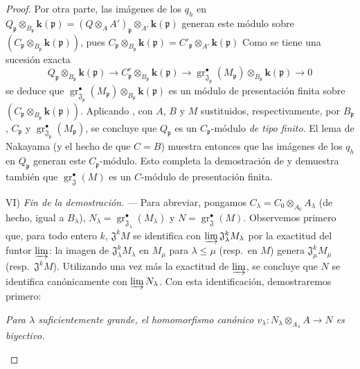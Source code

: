 \begin{proof}
Por otra parte, las imágenes de los $q_h$ en
$Q_\mathfrak p\otimes_{B_\mathfrak p}\boldsymbol{k}(\mathfrak p)
=(Q\otimes_AA')_\mathfrak p\otimes_{A'}\boldsymbol{k}(\mathfrak p)$
generan este módulo sobre $(C_\mathfrak p\otimes_{B_\mathfrak p}\boldsymbol{k}(\mathfrak p))$, pues
$C_\mathfrak p\otimes_{B_\mathfrak p}\boldsymbol{k}(\mathfrak p)
=C'_\mathfrak p\otimes_{A'}\boldsymbol{k}(\mathfrak p)$
Como se tiene una sucesión exacta
\[
Q_\mathfrak p\otimes_{B_\mathfrak p}\boldsymbol{k}(\mathfrak p)
\longrightarrow C_\mathfrak p^{r}\otimes_{B_\mathfrak p}\boldsymbol{k}(\mathfrak p)
\longrightarrow
\operatorname{gr}_{\mathfrak J_\mathfrak p}^\bullet(M_\mathfrak p)
\otimes_{B_\mathfrak p}\boldsymbol{k}(\mathfrak p)\longrightarrow0
\]
se deduce que $\operatorname{gr}_{\mathfrak J_\mathfrak p}^\bullet(M_\mathfrak p)
\otimes_{B_\mathfrak p}\boldsymbol{k}(\mathfrak p)$ es un módulo de presentación finita sobre $(C_\mathfrak p\otimes_{B_\mathfrak p}\boldsymbol{k}(\mathfrak p))$. Aplicando , con $A$, $B$ y $M$ sustituidos, respectivamente, por $B_\mathfrak p$, $C_\mathfrak p$ y $\operatorname{gr}_{\mathfrak J_\mathfrak p}^\bullet(M_\mathfrak p)$, se concluye que $Q_\mathfrak p$ es un $C_\mathfrak p$-módulo \emph{de tipo finito}. El lema de Nakayama (y el hecho de que $C=B$) muestra entonces que las imágenes de los $q_h$ en $Q_\mathfrak p$ generan este $C_\mathfrak p$-módulo. Esto completa la demostración de  y demuestra también que $\operatorname{gr}_{\mathfrak J}^\bullet(M)$ es un $C$-módulo de presentación finita.

\medskip
\noindent VI) \emph{Fin de la demostración.} --- Para abreviar, pongamos $C_\lambda=C_0\otimes_{A_0}A_\lambda$ (de hecho, igual a $B_\lambda$), $N_\lambda=\operatorname{gr}_{\mathfrak J_\lambda}^\bullet(M_\lambda)$ y $N=\operatorname{gr}_{\mathfrak J}^\bullet(M)$. Observemos primero que, para todo entero $k$, $\mathfrak J^kM$ se identifica con $\varinjlim\mathfrak J_\lambda^kM_\lambda$ por la exactitud del funtor $\varinjlim$: la imagen de $\mathfrak J_\lambda^kM_\lambda$ en $M_\mu$ para $\lambda\leq\mu$ (resp.\ en $M$) genera $\mathfrak J_\mu^kM_\mu$ (resp.\ $\mathfrak J^kM$). Utilizando una vez más la exactitud de $\varinjlim$, se concluye que $N$ se identifica canónicamente con $\varinjlim N_\lambda$. Con esta identificación, demostraremos primero:
\begin{env}[11.2.9.9]
\label{IV.11.2.9.9}
\emph{Para $\lambda$ suficientemente grande, el homomorfismo canónico
$v_\lambda:N_\lambda\otimes_{A_\lambda}A\to N$ es biyectivo.}
\end{env}


\end{proof}
